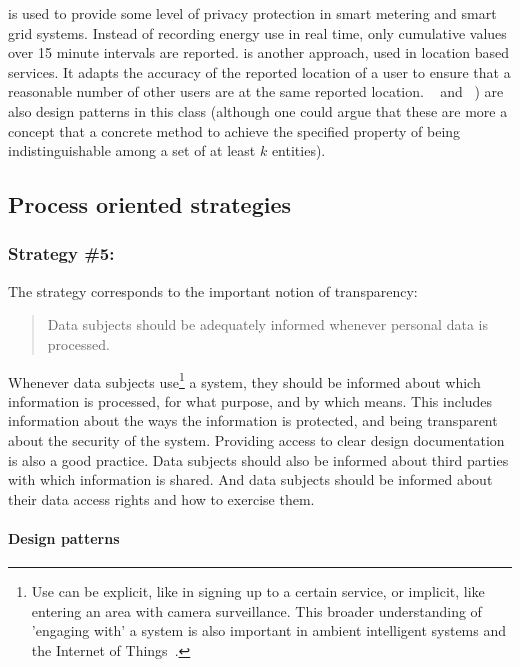  is used to provide some level of privacy protection in smart metering and smart grid systems. Instead of recording  energy use in real time, only cumulative values over 15 minute intervals are reported.
 is another approach, used in location based services. It adapts the accuracy of the reported location of a user to ensure that a reasonable number of other users are at the same reported location.
~\cite{DBLP:journals/ijufks/Sweene02} and  ~\cite{DBLP:journals/tkdd/MachanavajjhalaKGV07}) are also design patterns in this class (although one could argue that these are more a concept that a concrete method to achieve the specified property of being indistinguishable among a set of at least $k$ entities).

\subsection{Process oriented strategies}

\subsubsection{Strategy \#5: }

The  strategy corresponds to the important notion of transparency:
\begin{quote}
Data subjects should be adequately informed whenever personal data is processed.
\end{quote}
Whenever data subjects use\footnote{Use can be explicit, like in signing up to a certain service, or implicit,
  like entering an area with camera surveillance. This broader understanding
  of 'engaging with' a system is also important in ambient intelligent systems 
  and the Internet of Things~\cite{hoepman2011iot-trust}.
} 
a system, they should be informed about which information is processed, for what purpose, and by which means. This includes information about the ways the information is protected, and being transparent about the security of the system. Providing access to clear design documentation is also a good practice. Data subjects should also be informed about third parties with which information is shared. And data subjects should be informed about their data access rights and how to exercise them.

\paragraph{Design patterns}


